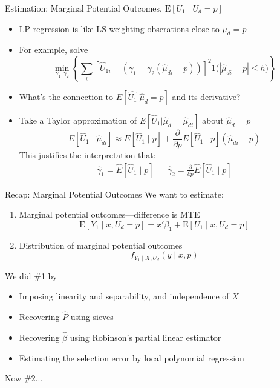 \documentclass{beamer}
\begin{document}
\begin{frame}{Estimation:  Marginal Potential Outcomes,
    $\mathrm{E}[U_1\mid U_d=p]$}
  \begin{itemize}
    \item LP regression is like LS weighting obserations close to ${\mu}_d=p$ \pause
\item For example, solve
  \begin{equation*}
   \min_{\gamma_1,\gamma_2} \left\{ \sum_i\left[\hat{U}_{1i}-(\gamma_1 +
      \gamma_2(\hat{\mu}_{di}-p))\right]^2\mathrm{1}{\bigl(|\hat{\mu}_{di} - p| \le h\bigr)}\right\}
  \end{equation*} \pause
\item What's the connection to $E[\hat{U_1}|\hat{\mu}_d=p]$ and its derivative? \pause 
\item Take a Taylor approximation of $E[\hat{U}_{1}| \hat{\mu}_{d}=\hat{\mu}_{di}]$
  about $\hat{\mu}_d = p$
  \begin{equation*}
    E[\hat{U}_{1}\mid \hat{\mu}_{di}] \approx E[\hat{U}_{1}\mid p] +
    \frac{\partial}{\partial p} E[\hat{U}_{1}\mid p] (\hat{\mu}_{di}-p)
  \end{equation*} \pause
This justifies the interpretation that:
\begin{eqnarray*}
  \hat{\gamma}_1 = \hat{E}[\hat{U}_{1}\mid p] & & \hat{\gamma}_2 = \frac{\partial}{\partial p} \hat{E}[\hat{U}_{1}\mid p]
\end{eqnarray*}
  \end{itemize}
\end{frame}

\begin{frame}{Recap:  Marginal Potential Outcomes}
We want to estimate:
\begin{enumerate}
\item Marginal potential outcomes---difference is MTE
\begin{equation*}
  \mathrm{E}[Y_1\mid x,U_d=p] = x'\beta_1 +
  \mathrm{E}[U_1\mid x,U_d=p]
\end{equation*}
\item Distribution of marginal potential outcomes
  \begin{equation*}
    f_{Y_1\mid X,U_d}(y\mid x,p)
  \end{equation*}
\end{enumerate}

We did \#1 by
\begin{itemize}
\item Imposing linearity and separability, and independence of $X$
\item Recovering $\hat{P}$ using sieves
\item Recovering $\hat{\beta}$ using Robinson's partial linear
  estimator
\item Estimating the selection error by local polynomial regression
\end{itemize}
Now \#2...

\end{frame}
\end{document}
